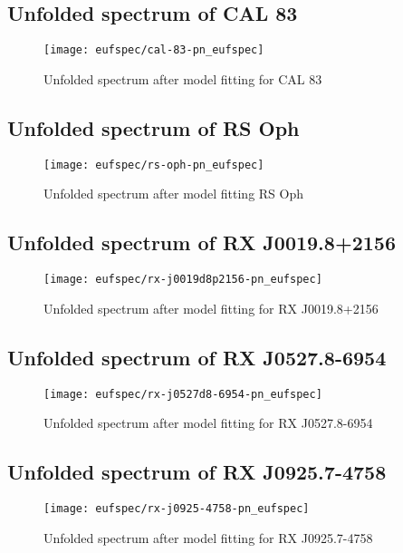 		\subsection*{Unfolded spectrum of CAL 83}
			\begin{figure}[h!]
				\centering
				\texttt{[image: eufspec/cal-83-pn\_eufspec]}
				\caption{Unfolded spectrum after model fitting for CAL 83}
				\label{result:euf-cal-83}
			\end{figure}
		
		\subsection*{Unfolded spectrum of RS Oph}
			\begin{figure}[h!]
				\centering
				\texttt{[image: eufspec/rs-oph-pn\_eufspec]}
				\caption{Unfolded spectrum after model fitting RS Oph}
				\label{result:euf-rs-oph}
			\end{figure}
		
		\subsection*{Unfolded spectrum of RX J0019.8+2156}
			\begin{figure}[h!]
				\centering
				\texttt{[image: eufspec/rx-j0019d8p2156-pn\_eufspec]}
				\caption{Unfolded spectrum after model fitting for RX J0019.8+2156}
				\label{result:euf-rx-j0019}
			\end{figure}
		
		\subsection*{Unfolded spectrum of RX J0527.8-6954}
			\begin{figure}[h!]
				\centering
				\texttt{[image: eufspec/rx-j0527d8-6954-pn\_eufspec]}
				\caption{Unfolded spectrum after model fitting for RX J0527.8-6954}
				\label{result:euf-rx-j0527}
			\end{figure}
		
		\subsection*{Unfolded spectrum of RX J0925.7-4758}
			\begin{figure}[h!]
				\centering
				\texttt{[image: eufspec/rx-j0925-4758-pn\_eufspec]}
				\caption{Unfolded spectrum after model fitting for RX J0925.7-4758}
				\label{result:euf-rx-j0925}
			\end{figure}
		
